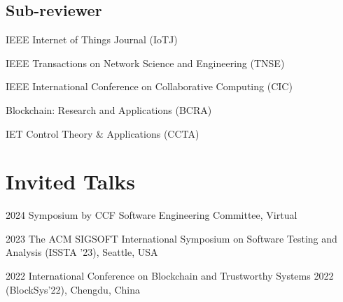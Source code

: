 \documentclass[12pt,letterpaper]{report}
\newcommand{\listitemspace}{0.25em}
\renewenvironment{itemize}
{\begin{list}{}{\setlength{\leftmargin}{0em}
                \setlength{\parskip}{0em}
                \setlength{\itemsep}{\listitemspace}
                \setlength{\parsep}{\listitemspace}}}
{\end{list}}
\begin{document}
    \subsection*{Sub-reviewer}
    \begin{itemize}
        \item IEEE Internet of Things Journal (IoTJ)
        \item IEEE Transactions on Network Science and Engineering (TNSE)
        \item IEEE International Conference on Collaborative Computing (CIC)
        \item Blockchain: Research and Applications (BCRA)
        \item IET Control Theory \& Applications (CCTA)
    \end{itemize}

    \section*{Invited Talks}
    \begin{tablist}
        \item[2024] \tab{}Symposium by CCF Software Engineering Committee, Virtual
        \item[2023] \tab{}The ACM SIGSOFT International Symposium on Software Testing and Analysis (ISSTA '23), Seattle, USA
        \item[2022] \tab{}International Conference on Blockchain and Trustworthy Systems 2022 (BlockSys'22), Chengdu, China
    \end{tablist}


\end{document}
